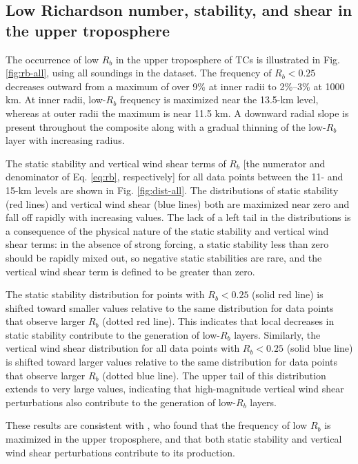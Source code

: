 \subsection{Low Richardson number, stability, and shear in the upper troposphere}

The occurrence of low $R_b$ in the upper troposphere of TCs is illustrated in Fig. \ref{fig:rb-all}, using all soundings in the dataset.
The frequency of $R_b < 0.25$ decreases outward from a maximum of over 9\% at inner radii to 2\%–3\% at 1000 km.
At inner radii, low-$R_b$ frequency is maximized near the 13.5-km level, whereas at outer radii the maximum is near 11.5 km.
A downward radial slope is present throughout the composite along with a gradual thinning of the low-$R_b$ layer with increasing radius.

The static stability and vertical wind shear terms of $R_b$ [the  numerator  and  denominator  of  Eq. \ref{eq:rb},  respectively] for all data points between the 11- and 15-km levels are shown in Fig. \ref{fig:dist-all}.
The distributions of static stability (red lines) and vertical wind shear (blue lines) both are maximized near zero and fall off rapidly with increasing values.
The lack of a left tail in the distributions is a consequence of the physical nature of the static stability and vertical wind shear terms: in the absence of strong forcing, a static stability less than zero should be rapidly mixed out, so negative static stabilities are rare, and the vertical wind shear term is defined to be greater than zero.

The static stability distribution for points with $R_b < 0.25$ (solid red line) is shifted toward smaller values relative to the same distribution for data points that observe larger $R_b$ (dotted red line).
This indicates that local decreases in static stability contribute to the generation of low-$R_b$ layers.
Similarly, the vertical wind shear distribution for all data points with $R_b < 0.25$ (solid blue line) is shifted toward larger values relative to the same distribution for data points that observe larger $R_b$ (dotted blue line).
The upper tail of this distribution extends to very large values, indicating that high-magnitude vertical wind shear perturbations also contribute to the generation of low-$R_b$ layers.

These results are consistent with \cite{Molinarietal2014}, who found that the frequency of low $R_b$ is maximized in the upper troposphere, and that both static stability and vertical wind shear perturbations contribute to its production.

